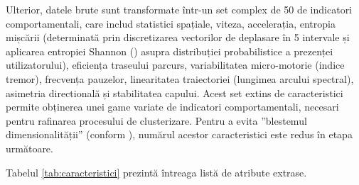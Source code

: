 \documentclass[12pt,a4paper]{report}
\theoremstyle{definition}
\theoremstyle{remark}
\begin{document}
Ulterior, datele brute sunt transformate într-un set complex de 50 de indicatori comportamentali, care includ statistici spațiale, viteza, accelerația, entropia mișcării (determinată prin discretizarea vectorilor de deplasare în 5 intervale și aplicarea entropiei Shannon (\textcite{KARACA2022231}) asupra distribuției probabilistice a prezenței utilizatorului), eficiența traseului parcurs, variabilitatea micro-motorie (indice tremor), frecvența pauzelor, linearitatea traiectoriei (lungimea arcului spectral), asimetria directională și stabilitatea capului. Acest set extins de caracteristici permite obținerea unei game variate de indicatori comportamentali, necesari pentru rafinarea procesului de clusterizare. Pentru a evita ”blestemul dimensionalității” (conform \textcite{bellman1957dynamic}), numărul acestor caracteristici este redus în etapa următoare.

Tabelul \ref{tab:caracteristici} prezintă întreaga listă de atribute extrase.
\end{document}
